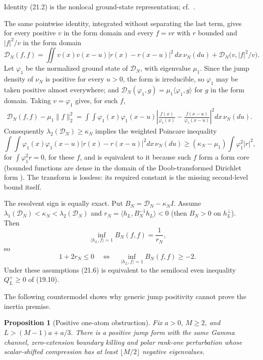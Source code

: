 \documentclass[11pt]{amsart}
\newtheorem{proposition}[theorem]{Proposition}
\theoremstyle{definition}
\theoremstyle{remark}
\begin{document}
Identity (21.2) is the nonlocal ground-state representation; cf.\
\cite{FrankSeiringer}.

The same pointwise identity, integrated without separating the last
term, gives for every positive \(v\) in the form domain and every
\(f=vr\) with \(r\) bounded and \(|f|^2/v\) in the form domain
\[
 \mathcal D_N(f,f)=\iint v(x)v(x-u)|r(x)-r(x-u)|^2\,dx\,\nu_N(du)
 +\mathcal D_N\bigl(v,|f|^2/v\bigr).
\]
Let \(\varphi_1\) be the normalized ground state of \(\mathcal D_N\),
with eigenvalue \(\mu_1\).  Since the jump density of \(\nu_N\) is
positive for every \(u>0\), the form is irreducible, so \(\varphi_1\) may
be taken positive almost everywhere; and
\(\mathcal D_N(\varphi_1,g)=\mu_1\langle\varphi_1,g\rangle\) for \(g\) in
the form domain.  Taking \(v=\varphi_1\) gives, for such \(f\),
\[
\begin{aligned}
 \mathcal D_N(f,f)-\mu_1\|f\|_2^2
 =
 \int\!\!\int
 \varphi_1(x)\varphi_1(x-u)
 \left|
 \frac{f(x)}{\varphi_1(x)}
 -\frac{f(x-u)}{\varphi_1(x-u)}
 \right|^2dx\,\nu_N(du).
\end{aligned}
\tag{21.3}
\]
Consequently \(\lambda_2(\mathcal D_N)\ge\kappa_N\) implies the
weighted Poincare inequality
\[
\int\!\!\int\varphi_1(x)\varphi_1(x-u)|r(x)-r(x-u)|^2
 dx\,\nu_N(du)
\ge(\kappa_N-\mu_1)\int\varphi_1^2|r|^2,
\tag{21.4}
\]
for \(\int\varphi_1^2r=0\), for these \(f\), and is equivalent to it because such \(f\) form a form core (bounded functions are dense in the domain of the Doob-transformed Dirichlet form \cite{FOT}).  The transform is lossless: its required
constant is the missing second-level bound itself.

The resolvent sign is equally exact.  Put
\(B_N=\mathcal D_N-\kappa_NI\).  Assume
\(\lambda_1(\mathcal D_N)<\kappa_N<\lambda_2(\mathcal D_N)\) and
\(r_N=\langle h_L,B_N^{-1}h_L\rangle<0\) (then \(B_N>0\) on
\(h_L^\perp\)).  Then
\[
 \inf_{\langle h_L,f\rangle=1}B_N(f,f)=\frac1{r_N},
\tag{21.5}
\]
so
\[
 1+2r_N\le0
 \quad\Longleftrightarrow\quad
 \inf_{\langle h_L,f\rangle=1}B_N(f,f)\ge-2.
\tag{21.6}
\]
Under these assumptions (21.6) is equivalent to the semilocal even
inequality \(Q_L^+\ge0\) of (19.10).

The following countermodel shows why generic jump positivity cannot prove
the inertia premise.

\begin{proposition}[Positive one-atom obstruction]
\label{prop:one-atom}
Fix \(a>0\), \(M\ge2\), and \(L>(M-1)a+a/3\).  There is a positive jump form with the same
Gamma channel, zero-extension boundary killing and polar rank-one
perturbation whose scalar-shifted compression has at least
\(\lfloor M/2\rfloor\) negative eigenvalues.
\end{proposition}
\end{document}

